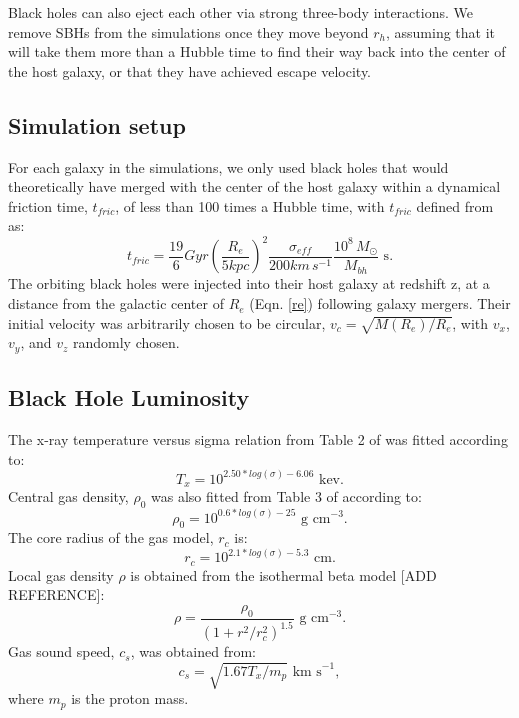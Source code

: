 \documentclass[english, apj]{emulateapj}
\begin{document}
Black holes can also eject each other via strong three-body interactions. We remove SBHs from the simulations once they move beyond $r_h$, assuming that it will take them more than a Hubble time to find their way back into the center of the host galaxy, or that they have achieved escape velocity.

\subsection{Simulation setup}
For each galaxy in the simulations, we only used black holes that would theoretically have merged with the center of the host galaxy within a dynamical friction time, $t_{fric}$, of less than 100 times a Hubble time, with $t_{fric}$ defined from \citet{2008gady.book.....B} as:
\begin{equation}\label{tfric}
    t_{fric} = \frac{19}{6}Gyr\left(\frac{R_e}{5kpc}\right)^2\frac{\sigma_{eff}}{200km\,s^{-1}}\frac{10^8\,M_{\odot}}{M_{bh}} \text{  s}.
\end{equation}
The orbiting black holes were injected into their host galaxy at redshift z, at a distance from the galactic center of $R_{e}$ (Eqn. \ref{re}) following galaxy mergers.  Their initial velocity was arbitrarily chosen to be circular, $v_c = \sqrt{M(R_e)/R_e}$, with $v_x$, $v_y$, and $v_z$ randomly chosen.

\subsection{Black Hole Luminosity}
The x-ray temperature versus sigma relation from Table 2 of  \citet{2018ApJ...857...32B} was fitted according to:
\begin{equation}
    T_x = 10^{2.50*log(\sigma) - 6.06} \text{  kev}.
\end{equation}
Central gas density, ${\rho}_0$ was also fitted from Table 3 of \citet{2018ApJ...857...32B} according to:
\begin{equation}
    \rho_0 = 10^{0.6*log(\sigma) - 25} \text{  g cm}^{-3}.
\end{equation}
The core radius of the gas model, ${r_c}$ is:
\begin{equation}
    r_c = 10^{2.1*log(\sigma) - 5.3} \text{  cm}.
\end{equation}
Local gas density ${\rho}$ is obtained from the isothermal beta model [ADD REFERENCE]:
\begin{equation} \label{beta_model}
    \rho = \frac{\rho_0}{(1+r^2/r_c^2)^{1.5}} \text{  g cm}^{-3}.
\end{equation}
Gas sound speed, $c_s$, was obtained from:
\begin{equation}
    c_s = \sqrt{1.67T_x/m_p} \text{  km s}^{-1},
\end{equation}
where $m_p$ is the proton mass.
\end{document}
